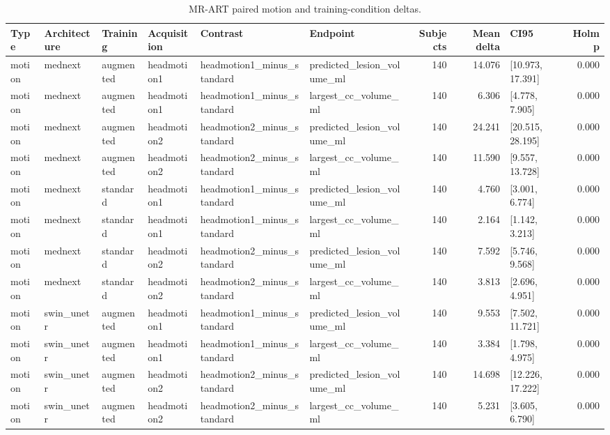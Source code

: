 \begin{table}
\caption{MR-ART paired motion and training-condition deltas.}
\label{tab:mrart_deltas}
\begin{tabular}{llllllrrlr}
\toprule
Type & Architecture & Training & Acquisition & Contrast & Endpoint & Subjects & Mean delta & CI95 & Holm p \\
\midrule
motion & mednext & augmented & headmotion1 & headmotion1\_minus\_standard & predicted\_lesion\_volume\_ml & 140 & 14.076 & [10.973, 17.391] & 0.000 \\
motion & mednext & augmented & headmotion1 & headmotion1\_minus\_standard & largest\_cc\_volume\_ml & 140 & 6.306 & [4.778, 7.905] & 0.000 \\
motion & mednext & augmented & headmotion2 & headmotion2\_minus\_standard & predicted\_lesion\_volume\_ml & 140 & 24.241 & [20.515, 28.195] & 0.000 \\
motion & mednext & augmented & headmotion2 & headmotion2\_minus\_standard & largest\_cc\_volume\_ml & 140 & 11.590 & [9.557, 13.728] & 0.000 \\
motion & mednext & standard & headmotion1 & headmotion1\_minus\_standard & predicted\_lesion\_volume\_ml & 140 & 4.760 & [3.001, 6.774] & 0.000 \\
motion & mednext & standard & headmotion1 & headmotion1\_minus\_standard & largest\_cc\_volume\_ml & 140 & 2.164 & [1.142, 3.213] & 0.000 \\
motion & mednext & standard & headmotion2 & headmotion2\_minus\_standard & predicted\_lesion\_volume\_ml & 140 & 7.592 & [5.746, 9.568] & 0.000 \\
motion & mednext & standard & headmotion2 & headmotion2\_minus\_standard & largest\_cc\_volume\_ml & 140 & 3.813 & [2.696, 4.951] & 0.000 \\
motion & swin\_unetr & augmented & headmotion1 & headmotion1\_minus\_standard & predicted\_lesion\_volume\_ml & 140 & 9.553 & [7.502, 11.721] & 0.000 \\
motion & swin\_unetr & augmented & headmotion1 & headmotion1\_minus\_standard & largest\_cc\_volume\_ml & 140 & 3.384 & [1.798, 4.975] & 0.000 \\
motion & swin\_unetr & augmented & headmotion2 & headmotion2\_minus\_standard & predicted\_lesion\_volume\_ml & 140 & 14.698 & [12.226, 17.222] & 0.000 \\
motion & swin\_unetr & augmented & headmotion2 & headmotion2\_minus\_standard & largest\_cc\_volume\_ml & 140 & 5.231 & [3.605, 6.790] & 0.000 \\

\end{tabular}
\end{table}
